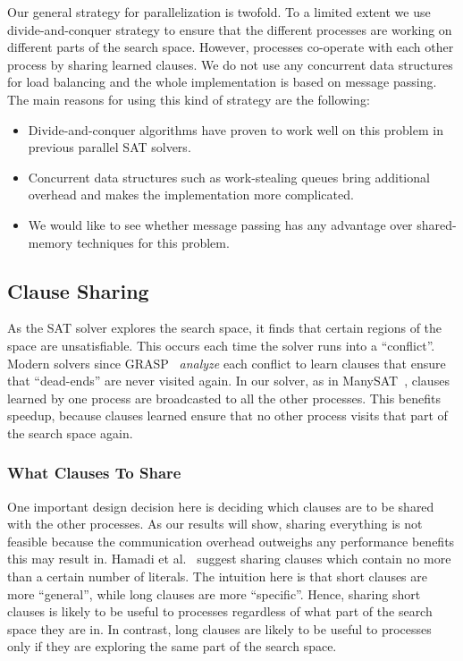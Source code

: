 \documentclass[letterpaper, compsoc, conference]{IEEEtran}
\begin{document}
Our general strategy for parallelization is twofold. To a limited extent we use
divide-and-conquer strategy to ensure that the different processes are working
on different parts of the search space. However, processes co-operate with each
other process by sharing learned clauses. We do not use any concurrent data 
structures for load balancing and the whole implementation is based on message
passing.  The main reasons for using this kind of strategy are the following:
\begin{itemize}
\item Divide-and-conquer algorithms have proven to work well on this problem
in previous parallel SAT solvers.
\item Concurrent data structures such as work-stealing queues bring additional 
overhead and makes the implementation more complicated.
\item We would like to see whether message passing has any advantage over
shared-memory techniques for this problem.
\end{itemize} 

\subsection{Clause Sharing}

As the SAT solver explores the search space, it finds that certain regions of
the space are unsatisfiable. This occurs each time the solver runs into a
``conflict''. Modern solvers since GRASP~\cite{Silva1997GRASP} \emph{analyze} each
conflict to learn clauses that ensure that ``dead-ends'' are never visited
again. In our solver, as in ManySAT~\cite{ManySAT}, clauses learned by one
process are broadcasted to all the other processes. This benefits speedup,
because clauses learned ensure that no other process visits that part 
of the search space again.

\subsubsection{What Clauses To Share}

One important design decision here is deciding which clauses are to be shared
with the other processes. As our results will show, sharing everything is not
feasible because the communication overhead outweighs any performance benefits
this may result in. Hamadi et al.~\cite{Hamadi} suggest sharing clauses which
contain no more than a certain number of literals. The intuition here is that
short clauses are more ``general'', while long clauses are more ``specific''.
Hence, sharing short clauses is likely to be useful to processes regardless of
what part of the search space they are in. In contrast, long clauses are likely
to be useful to processes only if they are exploring the same part of the
search space. 
\end{document}
